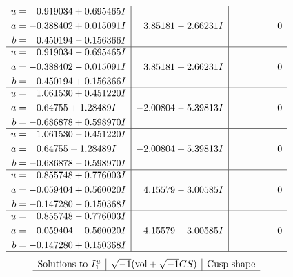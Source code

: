\documentclass[1p]{elsarticle_modified}
\theoremstyle{definition}
\newcommand{\I}{\sqrt{-1}}
\begin{document}
$$\begin{array}{c|c|c}
\begin{aligned}
u &= \phantom{-}0.919034 + 0.695465 I \\
a &= -0.388402 + 0.015091 I \\
b &= \phantom{-}0.450194 - 0.156366 I\end{aligned}
 & \phantom{-}3.85181 - 2.66231 I & \phantom{-0.000000 } 0 \\ \hline\begin{aligned}
u &= \phantom{-}0.919034 - 0.695465 I \\
a &= -0.388402 - 0.015091 I \\
b &= \phantom{-}0.450194 + 0.156366 I\end{aligned}
 & \phantom{-}3.85181 + 2.66231 I & \phantom{-0.000000 } 0 \\ \hline\begin{aligned}
u &= \phantom{-}1.061530 + 0.451220 I \\
a &= \phantom{-}0.64755 + 1.28489 I \\
b &= -0.686878 + 0.598970 I\end{aligned}
 & -2.00804 - 5.39813 I & \phantom{-0.000000 } 0 \\ \hline\begin{aligned}
u &= \phantom{-}1.061530 - 0.451220 I \\
a &= \phantom{-}0.64755 - 1.28489 I \\
b &= -0.686878 - 0.598970 I\end{aligned}
 & -2.00804 + 5.39813 I & \phantom{-0.000000 } 0 \\ \hline\begin{aligned}
u &= \phantom{-}0.855748 + 0.776003 I \\
a &= -0.059404 + 0.560020 I \\
b &= -0.147280 - 0.150368 I\end{aligned}
 & \phantom{-}4.15579 - 3.00585 I & \phantom{-0.000000 } 0 \\ \hline\begin{aligned}
u &= \phantom{-}0.855748 - 0.776003 I \\
a &= -0.059404 - 0.560020 I \\
b &= -0.147280 + 0.150368 I\end{aligned}
 & \phantom{-}4.15579 + 3.00585 I & \phantom{-0.000000 } 0\\
 \hline 
 \end{array}$$\newpage$$\begin{array}{c|c|c}  
\text{Solutions to }I^u_{1}& \I (\text{vol} + \sqrt{-1}CS) & \text{Cusp shape}\\
 \hline 

\end{array}$$
\end{document}
